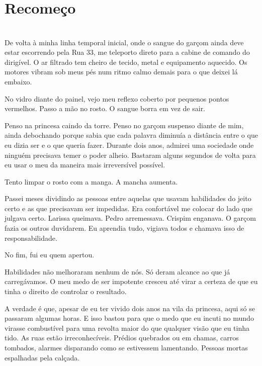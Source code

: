 \newpage
\ifdefined\useChapters
\chapter{Recomeço}
\else
\chapter{}
\fi

De volta à minha linha temporal inicial, onde o sangue do garçom ainda deve estar escorrendo pela Rua 33, me teleporto direto para a cabine de comando do dirigível. O ar filtrado tem cheiro de tecido, metal e equipamento aquecido. Os motores vibram sob meus pés num ritmo calmo demais para o que deixei lá embaixo.

No vidro diante do painel, vejo meu reflexo coberto por pequenos pontos vermelhos. Passo a mão no rosto. O sangue borra em vez de sair.

Penso na princesa caindo da torre. Penso no garçom suspenso diante de mim, ainda debochando porque sabia que cada palavra diminuía a distância entre o que eu dizia ser e o que queria fazer. Durante dois anos, admirei uma sociedade onde ninguém precisava temer o poder alheio. Bastaram alguns segundos de volta para eu usar o meu da maneira mais irreversível possível.

Tento limpar o rosto com a manga. A mancha aumenta.

Passei meses dividindo as pessoas entre aquelas que usavam habilidades do jeito certo e as que precisavam ser impedidas. Era confortável me colocar do lado que julgava certo. Larissa queimava. Pedro arremessava. Crispim enganava. O garçom fazia os outros duvidarem. Eu aprendia tudo, vigiava todos e chamava isso de responsabilidade.

No fim, fui eu quem apertou.

Habilidades não melhoraram nenhum de nós. Só deram alcance ao que já carregávamos. O meu medo de ser impotente cresceu até virar a certeza de que eu tinha o direito de controlar o resultado.

\bigskip

A verdade é que, apesar de eu ter vivido dois anos na vila da princesa, aqui só se passaram algumas horas. E isso bastou para que o medo que eu incuti no mundo virasse combustível para uma revolta maior do que qualquer visão que eu tinha tido. As ruas estão irreconhecíveis. Prédios quebrados ou em chamas, carros tombados, alarmes disparando como se estivessem lamentando. Pessoas mortas espalhadas pela calçada.


